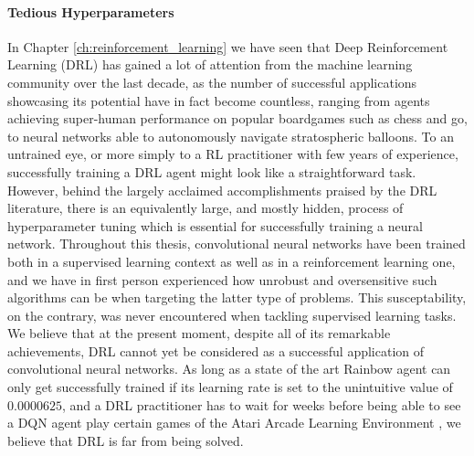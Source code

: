 \paragraph{Tedious Hyperparameters}

In Chapter \ref{ch:reinforcement_learning} we have seen that Deep Reinforcement Learning (DRL) has gained a lot of attention from the machine learning community over the last decade, as the number of successful applications showcasing its potential have in fact become countless, ranging from agents achieving super-human performance on popular boardgames such as chess and go, to neural networks able to autonomously navigate stratospheric balloons. To an untrained eye, or more simply to a RL practitioner with few years of experience, successfully training a DRL agent might look like a straightforward task. However, behind the largely acclaimed accomplishments praised by the DRL literature, there is an equivalently large, and mostly hidden, process of hyperparameter tuning which is essential for successfully training a neural network. Throughout this thesis, convolutional neural networks have been trained both in a supervised learning context as well as in a reinforcement learning one, and we have in first person experienced how unrobust and oversensitive such algorithms can be when targeting the latter type of problems. This susceptability, on the contrary, was never encountered when tackling supervised learning tasks. We believe that at the present moment, despite all of its remarkable achievements, DRL cannot yet be considered as a successful application of convolutional neural networks. As long as a state of the art Rainbow agent \cite{hessel2018rainbow} can only get successfully trained if its learning rate is set to the unintuitive value of $0.0000625$, and a DRL practitioner has to wait for weeks before being able to see a DQN agent play certain games of the Atari Arcade Learning Environment \cite{kaiser2019model}, we believe that DRL is far from being solved.


